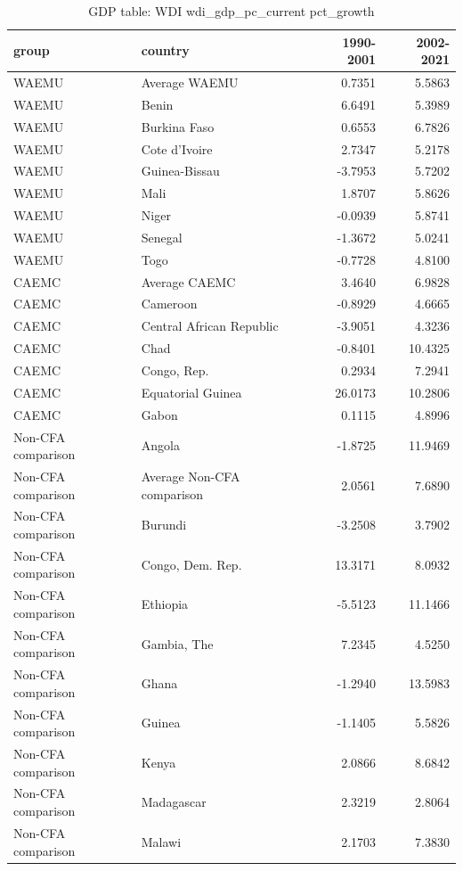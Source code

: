 \begin{table}

\caption{GDP table: WDI wdi_gdp_pc_current pct_growth}
\centering
\begin{tabular}[t]{llrr}
\toprule
group & country & 1990-2001 & 2002-2021\\
\midrule
WAEMU & Average WAEMU & 0.7351 & 5.5863\\
WAEMU & Benin & 6.6491 & 5.3989\\
WAEMU & Burkina Faso & 0.6553 & 6.7826\\
WAEMU & Cote d'Ivoire & 2.7347 & 5.2178\\
WAEMU & Guinea-Bissau & -3.7953 & 5.7202\\
\addlinespace
WAEMU & Mali & 1.8707 & 5.8626\\
WAEMU & Niger & -0.0939 & 5.8741\\
WAEMU & Senegal & -1.3672 & 5.0241\\
WAEMU & Togo & -0.7728 & 4.8100\\
CAEMC & Average CAEMC & 3.4640 & 6.9828\\
\addlinespace
CAEMC & Cameroon & -0.8929 & 4.6665\\
CAEMC & Central African Republic & -3.9051 & 4.3236\\
CAEMC & Chad & -0.8401 & 10.4325\\
CAEMC & Congo, Rep. & 0.2934 & 7.2941\\
CAEMC & Equatorial Guinea & 26.0173 & 10.2806\\
\addlinespace
CAEMC & Gabon & 0.1115 & 4.8996\\
Non-CFA comparison & Angola & -1.8725 & 11.9469\\
Non-CFA comparison & Average Non-CFA comparison & 2.0561 & 7.6890\\
Non-CFA comparison & Burundi & -3.2508 & 3.7902\\
Non-CFA comparison & Congo, Dem. Rep. & 13.3171 & 8.0932\\
\addlinespace
Non-CFA comparison & Ethiopia & -5.5123 & 11.1466\\
Non-CFA comparison & Gambia, The & 7.2345 & 4.5250\\
Non-CFA comparison & Ghana & -1.2940 & 13.5983\\
Non-CFA comparison & Guinea & -1.1405 & 5.5826\\
Non-CFA comparison & Kenya & 2.0866 & 8.6842\\
\addlinespace
Non-CFA comparison & Madagascar & 2.3219 & 2.8064\\
Non-CFA comparison & Malawi & 2.1703 & 7.3830\\

\end{tabular}
\end{table}

